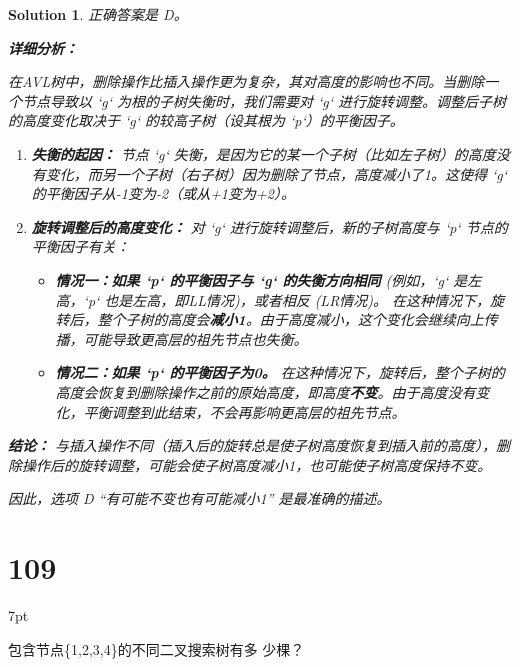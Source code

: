 \documentclass[UTF8]{report}
\newtheorem{solution}{Solution}
\theoremstyle{MyLineTheoremStyle} %
\theoremstyle{MyBlockTheoremStyle} %
\theoremstyle{MySubsubsectionStyle} %
\newenvironment{graybox}{%
        \def\FrameCommand{%
        \hspace{1pt}%
        {\color{gray}\small \vrule width 2pt}%
        {\color{graybox_color}\vrule width 4pt}%
        \colorbox{graybox_color}%
        }%
        \MakeFramed{\advance\hsize-\width\FrameRestore}%
        \noindent\hspace{-4.55pt}%
        \begin{adjustwidth}{}{7pt}%
        \vspace{2pt}\vspace{2pt}%
        }
        {%
        \vspace{2pt}\end{adjustwidth}\endMakeFramed%
        }
\begin{document}
\begin{solution}
正确答案是 D。

\textbf{详细分析：}

在AVL树中，删除操作比插入操作更为复杂，其对高度的影响也不同。当删除一个节点导致以 `g` 为根的子树失衡时，我们需要对 `g` 进行旋转调整。调整后子树的高度变化取决于 `g` 的较高子树（设其根为 `p`）的平衡因子。

\begin{enumerate}
    \item \textbf{失衡的起因：}
    节点 `g` 失衡，是因为它的某一个子树（比如左子树）的高度没有变化，而另一个子树（右子树）因为删除了节点，高度减小了1。这使得 `g` 的平衡因子从-1变为-2（或从+1变为+2）。

    \item \textbf{旋转调整后的高度变化：}
    对 `g` 进行旋转调整后，新的子树高度与 `p` 节点的平衡因子有关：
    \begin{itemize}
        \item \textbf{情况一：如果 `p` 的平衡因子与 `g` 的失衡方向相同} (例如，`g` 是左高，`p` 也是左高，即LL情况)，或者相反 (LR情况)。
        在这种情况下，旋转后，整个子树的高度会\textbf{减小1}。由于高度减小，这个变化会继续向上传播，可能导致更高层的祖先节点也失衡。

        \item \textbf{情况二：如果 `p` 的平衡因子为0。}
        在这种情况下，旋转后，整个子树的高度会恢复到删除操作之前的原始高度，即高度\textbf{不变}。由于高度没有变化，平衡调整到此结束，不会再影响更高层的祖先节点。
    \end{itemize}
\end{enumerate}

\textbf{结论：}
与插入操作不同（插入后的旋转总是使子树高度恢复到插入前的高度），删除操作后的旋转调整，可能会使子树高度减小1，也可能使子树高度保持不变。

因此，选项 D “有可能不变也有可能减小1” 是最准确的描述。
\end{solution}


\section*{109}
\begin{graybox}
包含节点\{1,2,3,4\}的不同二叉搜索树有多
少棵？
\end{graybox}
\end{document}
